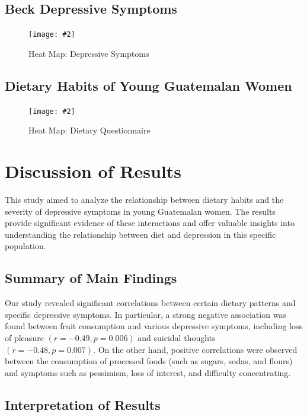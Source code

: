 \documentclass[jou]{apa7}
\newcommand{\includegraphicsmax}[2][]{%
	\texttt{[image: \#2]}%
}
\begin{document}
\subsection{Beck Depressive Symptoms}
\begin{figure}[!ht]
	\centering
	\includegraphicsmax{sintomasDepresivosBeckGraph.pdf}
	\caption{Heat Map: Depressive Symptoms}
	\label{fig:Figure2}
\end{figure}
\vspace{-1em} %

\subsection{Dietary Habits of Young Guatemalan Women}
\begin{figure}[!ht]
	\centering
	\includegraphicsmax{dietGraph.pdf}
	\caption{Heat Map: Dietary Questionnaire}
	\label{fig:Figure3}
\end{figure}

\section{Discussion of Results}\label{discusiuxf3n-de-resultados}

This study aimed to analyze the relationship between dietary habits and the severity of depressive symptoms in young Guatemalan women. The results provide significant evidence of these interactions and offer valuable insights into understanding the relationship between diet and depression in this specific population.

\subsection{Summary of Main Findings}\label{resumen-de-hallazgos-principales}

Our study revealed significant correlations between certain dietary patterns and specific depressive symptoms. In particular, a strong negative association was found between fruit consumption and various depressive symptoms, including loss of pleasure $(r = -0.49, p = 0.006)$ and suicidal thoughts $(r = -0.48, p = 0.007)$. On the other hand, positive correlations were observed between the consumption of processed foods (such as sugars, sodas, and flours) and symptoms such as pessimism, loss of interest, and difficulty concentrating.

\subsection{Interpretation of Results}\label{interpretaciuxf3n-de-resultados}
\end{document}
